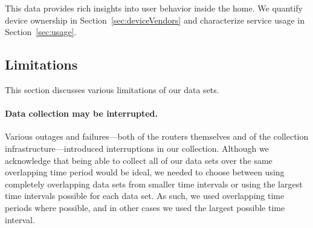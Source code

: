 \noindent This data provides rich insights into user behavior inside the home.
We quantify device ownership in Section~\ref{sec:deviceVendors} and characterize
service usage in Section~\ref{sec:usage}.




\subsection{Limitations}

\noindent This section discusses various limitations of our data sets.

\paragraph{Data collection may be interrupted.} Various outages and failures---both of
the routers themselves and of the collection infrastructure---introduced
interruptions in our collection.  Although we acknowledge that being able to
collect all of our data sets over the same overlapping time period would be
ideal, we needed to choose between using completely overlapping data sets from
smaller time intervals or using the largest time intervals possible for each
data set.  As such, we used overlapping time periods where possible, and in other
cases we used the largest possible time interval.

